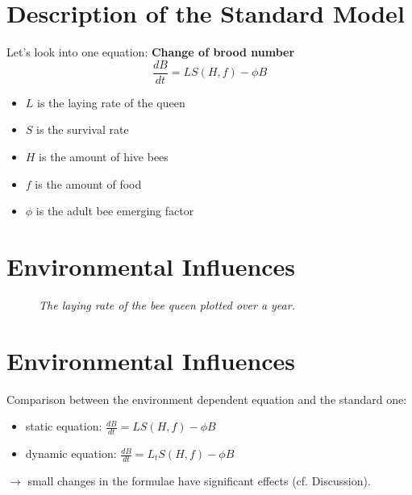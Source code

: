 \documentclass[
	paper=128mm:96mm,
	fontsize=11pt,
	pagesize,
	parskip=half-,
]{scrartcl}
\theoremstyle{mythmstyle} %
\begin{document}
\section*{Description of the Standard Model}
	Let's look into one equation: \textbf{Change of brood number}
	\begin{equation*}
			\frac{dB}{dt} = LS(H,f)-\phi B
	\end{equation*}
	\begin{itemize}
	\item $L$ is the laying rate of the queen
	\item $S$ is the survival rate
	\item $H$ is the amount of hive bees
	\item $f$ is the amount of food
	\item $\phi$ is the adult bee emerging factor
	\end{itemize}
	\clearpage
\section{Environmental Influences}
	\begin{figure}[H]
		\centering
		\caption{\textit{The laying rate of the bee queen plotted over a year.}}
	\end{figure}
	\clearpage
\section*{Environmental Influences}
	Comparison between the environment dependent equation and the standard one: 
	\begin{itemize}
		\item static equation: $	\frac{dB}{dt} = LS(H,f)-\phi B $
		\item dynamic equation: $\frac{dB}{dt} = L_tS(H,f)-\phi B$
	\end{itemize}
	$\longrightarrow$ small changes in the formulae have significant effects (cf. Discussion).
	\clearpage
\end{document}

